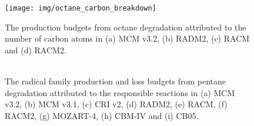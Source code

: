 
\begin{figure}[h!]
    \begin{center}
        \texttt{[image: img/octane\_carbon\_breakdown]}
        \caption{The  production budgets from octane degradation attributed to the number of carbon atoms in (a) MCM v3.2, (b) RADM2, (c) RACM and (d) RACM2.}
        \label{f:octane_carbons}
    \end{center}
\end{figure} 

\begin{figure}[h!]
    \begin{center}
        \includegraphics[width=\textwidth]{img/pentane_radicals_budget_reactions}
        \caption{The radical family production and loss budgets from pentane degradation attributed to the responsible reactions in (a) MCM v3.2, (b) MCM v3.1, (c) CRI v2, (d) RADM2, (e) RACM, (f) RACM2, (g) MOZART-4, (h) CBM-IV and (i) CB05.}
        \label{f:pentane_radical}
    \end{center}
\end{figure} 

